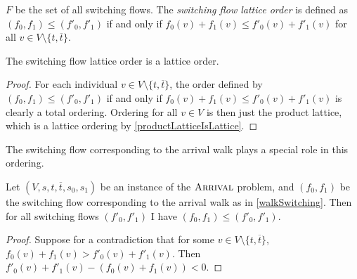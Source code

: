 \begin{definition}
\begin{definition}
    $F$ be the set of all switching flows. The \emph{switching flow lattice order} is
    defined as $(f_0, f_1) \leq (f'_0, f'_1)$ if and only if $f_0(v) + f_1(v) \leq f'_0(v) + f'_1(v)$
    for all $v \in V \setminus \{t, \overline{t}\}$.
  \end{definition}
  \begin{lemma}
    The switching flow lattice order is a lattice order.
  \end{lemma}
  \newcommand{\flf}{(f_0, f_1) \leq (f'_0, f'_1)}
  \begin{proof}
    For each individual $v \in V \setminus \{t, \overline{t}\}$, the order defined by
    $\flf$ if and only if $f_0(v) + f_1(v) \leq f'_0(v) + f'_1(v)$
    is clearly a total ordering. Ordering for all $v \in V$ is then just the product lattice,
    which is a lattice ordering by \cref{productLatticeIsLattice}.
  \end{proof}
  The switching flow corresponding to the arrival walk plays a special role in this ordering.
  \begin{lemma}
    Let $(V, s, t, \overline{t}, s_0, s_1)$ be an instance of the $\textsc{Arrival}$ problem, and
    $(f_0, f_1)$ be the switching flow corresponding to the arrival walk as in \cref{walkSwitching}.
    Then for all switching flows $(f'_0, f'_1)$ I have $\flf$.
  \end{lemma}
  \newcommand{\ff}{f_0(v) + f_1(v)}
  \newcommand{\fpfp}{f'_0(v) + f'_1(v)}
  \begin{proof}
    Suppose for a contradiction that for some $v \in V \setminus \{t, \overline{t}\}$,
    $\ff >  \fpfp$. Then $\fpfp - (\ff) < 0$.
  \end{proof}
\end{definition}
